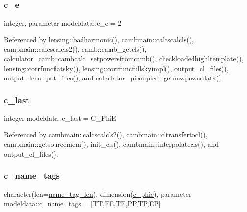 \mbox{\label{namespacemodeldata_a1697c6436c81028fc5378aa20c691bc6}} 
\subsubsection{\texorpdfstring{c\+\_\+e}{c\_e}}
{\footnotesize\ttfamily integer, parameter modeldata\+::c\+\_\+e = 2}



Referenced by lensing\+::badharmonic(), cambmain\+::calcscalcls(), cambmain\+::calcscalcls2(), camb\+::camb\+\_\+getcls(), calculator\+\_\+camb\+::cambcalc\+\_\+setpowersfromcamb(), checkloadedhighltemplate(), lensing\+::corrfuncflatsky(), lensing\+::corrfuncfullskyimpl(), output\+\_\+cl\+\_\+files(), output\+\_\+lens\+\_\+pot\+\_\+files(), and calculator\+\_\+pico\+::pico\+\_\+getnewpowerdata().

\mbox{\label{namespacemodeldata_a775752af289f0f86e09da60b795fd542}} 
\subsubsection{\texorpdfstring{c\+\_\+last}{c\_last}}
{\footnotesize\ttfamily integer modeldata\+::c\+\_\+last = C\+\_\+\+PhiE}



Referenced by cambmain\+::calcscalcls2(), cambmain\+::cltransfertocl(), cambmain\+::getsourcemem(), init\+\_\+cls(), cambmain\+::interpolatecls(), and output\+\_\+cl\+\_\+files().

\mbox{\label{namespacemodeldata_a5d4df179847dfc001c062789b178f4d1}} 
\subsubsection{\texorpdfstring{c\+\_\+name\+\_\+tags}{c\_name\_tags}}
{\footnotesize\ttfamily character(len=\mbox{\hyperlink{namespacemodeldata_a2ead755d89390eb003edcde34ebf2c99}{name\+\_\+tag\+\_\+len}}), dimension(\mbox{\hyperlink{namespacemodeldata_a0b2ffa13b78be0e1097e0696f61b3d67}{c\+\_\+phie}}), parameter modeldata\+::c\+\_\+name\+\_\+tags = \mbox{[}\textquotesingle{}TT\textquotesingle{},\textquotesingle{}EE\textquotesingle{},\textquotesingle{}TE\textquotesingle{},\textquotesingle{}PP\textquotesingle{},\textquotesingle{}TP\textquotesingle{},\textquotesingle{}EP\textquotesingle{}\mbox{]}}



